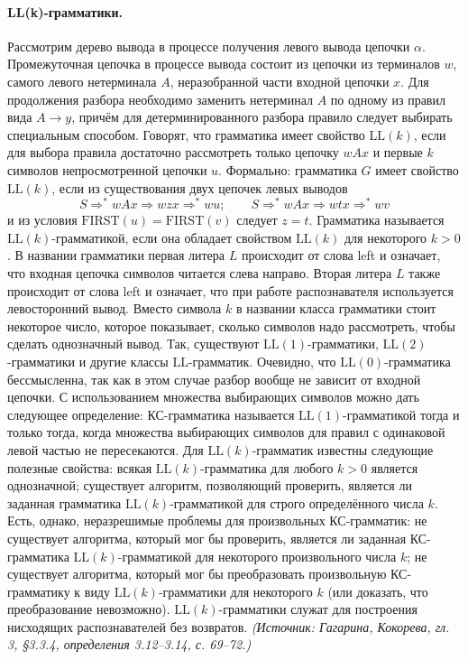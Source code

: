 \documentclass[a4paper,12pt]{article}
\begin{document}
\paragraph{LL(k)-грамматики.}
Рассмотрим дерево вывода в процессе получения левого вывода цепочки \(\alpha\). Промежуточная цепочка в процессе вывода состоит из цепочки из терминалов \(w\), самого левого нетерминала \(A\), неразобранной части входной цепочки \(x\). Для продолжения разбора необходимо заменить нетерминал \(A\) по одному из правил вида \(A\to y\), причём для детерминированного разбора правило следует выбирать специальным способом. Говорят, что грамматика имеет свойство \(\mathrm{LL}(k)\), если для выбора правила достаточно рассмотреть только цепочку \(wAx\) и первые \(k\) символов непросмотренной цепочки \(u\). Формально: грамматика \(G\) имеет свойство \(\mathrm{LL}(k)\), если из существования двух цепочек левых выводов
\[
S\Rightarrow^*wAx\Rightarrow wzx\Rightarrow^*wu;\qquad
S\Rightarrow^*wAx\Rightarrow wtx\Rightarrow^*wv
\]
и из условия \(\mathrm{FIRST}(u)=\mathrm{FIRST}(v)\) следует \(z=t\). Грамматика называется \(\mathrm{LL}(k)\)-грамматикой, если она обладает свойством \(\mathrm{LL}(k)\) для некоторого \(k>0\). В названии грамматики первая литера \(L\) происходит от слова left и означает, что входная цепочка символов читается слева направо. Вторая литера \(L\) также происходит от слова left и означает, что при работе распознавателя используется левосторонний вывод. Вместо символа \(k\) в названии класса грамматики стоит некоторое число, которое показывает, сколько символов надо рассмотреть, чтобы сделать однозначный вывод. Так, существуют \(\mathrm{LL}(1)\)-грамматики, \(\mathrm{LL}(2)\)-грамматики и другие классы \(\mathrm{LL}\)-грамматик. Очевидно, что \(\mathrm{LL}(0)\)-грамматика бессмысленна, так как в этом случае разбор вообще не зависит от входной цепочки. С использованием множества выбирающих символов можно дать следующее определение: КС-грамматика называется \(\mathrm{LL}(1)\)-грамматикой тогда и только тогда, когда множества выбирающих символов для правил с одинаковой левой частью не пересекаются. Для \(\mathrm{LL}(k)\)-грамматик известны следующие полезные свойства: всякая \(\mathrm{LL}(k)\)-грамматика для любого \(k>0\) является однозначной; существует алгоритм, позволяющий проверить, является ли заданная грамматика \(\mathrm{LL}(k)\)-грамматикой для строго определённого числа \(k\). Есть, однако, неразрешимые проблемы для произвольных КС-грамматик: не существует алгоритма, который мог бы проверить, является ли заданная КС-грамматика \(\mathrm{LL}(k)\)-грамматикой для некоторого произвольного числа \(k\); не существует алгоритма, который мог бы преобразовать произвольную КС-грамматику к виду \(\mathrm{LL}(k)\)-грамматики для некоторого \(k\) (или доказать, что преобразование невозможно). \(\mathrm{LL}(k)\)-грамматики служат для построения нисходящих распознавателей без возвратов.
\textit{(Источник: Гагарина, Кокорева, гл. 3, §3.3.4, определения 3.12--3.14, с. 69--72.)}
\end{document}

